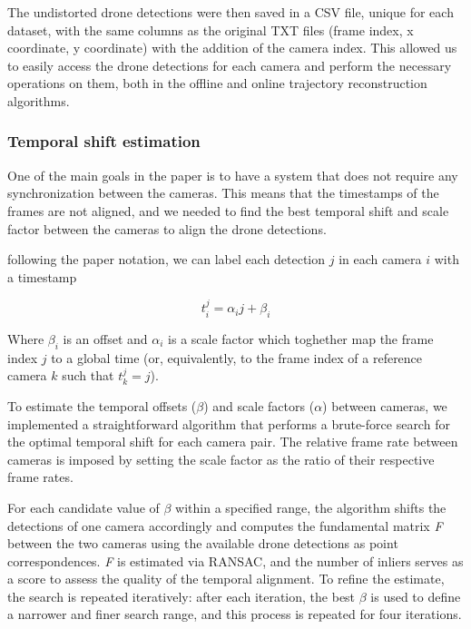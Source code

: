 \documentclass[11pt]{article}
\begin{document}
The undistorted drone detections were then saved in a CSV file, unique for each dataset, with the same columns as the original TXT files (frame index, x coordinate, y coordinate) with the addition of the camera index. This allowed us to easily access the drone detections for each camera and perform the necessary operations on them, both in the offline and online trajectory reconstruction algorithms.

\subsubsection{Temporal shift estimation}

One of the main goals in the paper is to have a system that does not require any synchronization between the cameras. This means that the timestamps of the frames are not aligned, and we needed to find the best temporal shift and scale factor between the cameras to align the drone detections.

following the paper notation, we can label each detection $j$ in each camera $i$ with a timestamp

\begin{equation}
    t_i^j = \alpha_i j + \beta_i
\end{equation}

Where $\beta_i$ is an offset and $\alpha_i$ is a scale factor which toghether map the frame index $j$ to a global time (or, equivalently, to the frame index of a reference camera $k$ such that $t_k^j = j$).

To estimate the temporal offsets ($\beta$) and scale factors ($\alpha$) between cameras, we implemented a straightforward algorithm that performs a brute-force search for the optimal temporal shift for each camera pair. The relative frame rate between cameras is imposed by setting the scale factor as the ratio of their respective frame rates.

For each candidate value of $\beta$ within a specified range, the algorithm shifts the detections of one camera accordingly and computes the fundamental matrix \textit{F} between the two cameras using the available drone detections as point correspondences. \textit{F} is estimated via RANSAC, and the number of inliers serves as a score to assess the quality of the temporal alignment. To refine the estimate, the search is repeated iteratively: after each iteration, the best $\beta$ is used to define a narrower and finer search range, and this process is repeated for four iterations.
\end{document}
